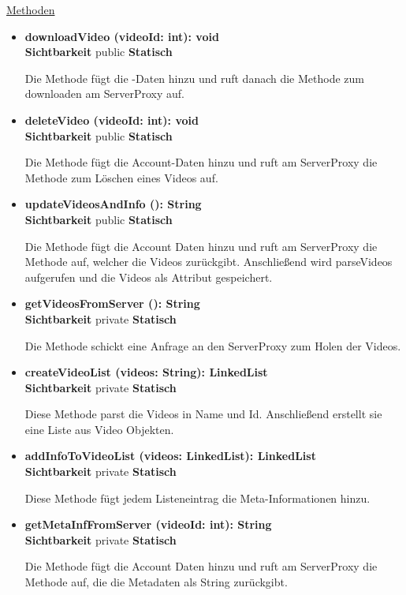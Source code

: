 \underline{Methoden}
\begin{itemize}
\itemsep0pt


\item \textbf{downloadVideo (videoId: int): void}\hfill\\
\textbf{Sichtbarkeit} public \newline
\textbf{Statisch}

Die Methode fügt die -Daten hinzu und ruft danach die Methode zum downloaden am ServerProxy auf.

\item \textbf{deleteVideo (videoId: int): void}\hfill\\
\textbf{Sichtbarkeit} public \newline
\textbf{Statisch}

Die Methode fügt die Account-Daten hinzu und ruft am ServerProxy die Methode zum Löschen eines Videos auf.

\item \textbf{updateVideosAndInfo (): String}\hfill\\
\textbf{Sichtbarkeit} public \newline
\textbf{Statisch}

Die Methode fügt die Account Daten hinzu und ruft am ServerProxy die Methode auf, welcher die Videos zurückgibt. Anschließend wird parseVideos aufgerufen und die Videos als Attribut gespeichert.

\item \textbf{getVideosFromServer (): String}\hfill\\
\textbf{Sichtbarkeit} private \newline
\textbf{Statisch}

Die Methode schickt eine Anfrage an den ServerProxy zum Holen der Videos.

\item \textbf{createVideoList (videos: String): LinkedList}\hfill\\
\textbf{Sichtbarkeit} private \newline
\textbf{Statisch}

Diese Methode parst die Videos in Name und Id. Anschließend erstellt sie eine Liste aus Video Objekten.

\item \textbf{addInfoToVideoList (videos: LinkedList): LinkedList}\hfill\\
\textbf{Sichtbarkeit} private \newline
\textbf{Statisch}

Diese Methode fügt jedem Listeneintrag die Meta-Informationen hinzu.

\item \textbf{getMetaInfFromServer (videoId: int): String}\hfill\\
\textbf{Sichtbarkeit} private \newline
\textbf{Statisch}

Die Methode fügt die Account Daten hinzu und ruft am ServerProxy die Methode auf, die die Metadaten als String zurückgibt.

\end{itemize}
